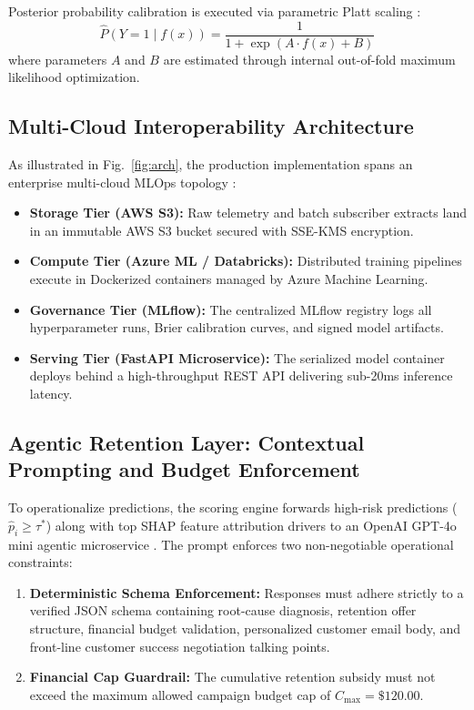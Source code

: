 \documentclass[journal,compsoc]{IEEEtran}
\begin{document}
Posterior probability calibration is executed via parametric Platt scaling \cite{platt1999probabilistic}:
\begin{equation}
\hat{P}(Y=1 \mid f(x)) = \frac{1}{1 + \exp(A \cdot f(x) + B)}
\label{eq:platt}
\end{equation}
where parameters $A$ and $B$ are estimated through internal out-of-fold maximum likelihood optimization.

\subsection{Multi-Cloud Interoperability Architecture}
As illustrated in Fig.~\ref{fig:arch}, the production implementation spans an enterprise multi-cloud MLOps topology \cite{armbrust2020lakehouse, kreuzberger2023mlops, sculley2015hidden}:
\begin{itemize}
    \item \textbf{Storage Tier (AWS S3):} Raw telemetry and batch subscriber extracts land in an immutable AWS S3 bucket secured with SSE-KMS encryption.
    \item \textbf{Compute Tier (Azure ML / Databricks):} Distributed training pipelines execute in Dockerized containers managed by Azure Machine Learning.
    \item \textbf{Governance Tier (MLflow):} The centralized MLflow registry \cite{zaharia2018accelerating} logs all hyperparameter runs, Brier calibration curves, and signed model artifacts.
    \item \textbf{Serving Tier (FastAPI Microservice):} The serialized model container deploys behind a high-throughput REST API delivering sub-20ms inference latency.
\end{itemize}

\subsection{Agentic Retention Layer: Contextual Prompting and Budget Enforcement}
To operationalize predictions, the scoring engine forwards high-risk predictions ($\hat{p}_i \ge \tau^*$) along with top SHAP feature attribution drivers \cite{lundberg2017unified} to an OpenAI GPT-4o mini agentic microservice \cite{achiam2023gpt4, yao2023react}. The prompt enforces two non-negotiable operational constraints:
\begin{enumerate}
    \item \textbf{Deterministic Schema Enforcement:} Responses must adhere strictly to a verified JSON schema containing root-cause diagnosis, retention offer structure, financial budget validation, personalized customer email body, and front-line customer success negotiation talking points.
    \item \textbf{Financial Cap Guardrail:} The cumulative retention subsidy must not exceed the maximum allowed campaign budget cap of $C_{\text{max}} = \$120.00$.
\end{enumerate}
\end{document}
